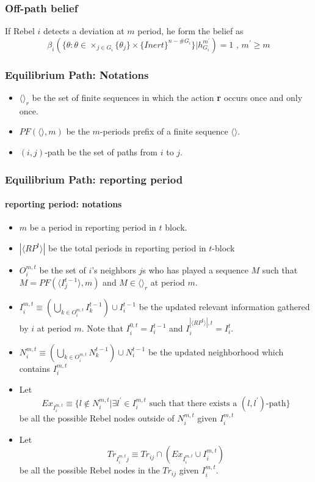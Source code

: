 \documentclass[12pt,letterpaper]{article}
\newtheorem*{main result}{Main Result}
\theoremstyle{definition}
\theoremstyle{remark}
\theoremstyle{claim}
\begin{document}
\subsubsection{Off-path belief}

If Rebel $i$ detects a deviation at $m$ period, he form the belief as
\begin{equation}
\beta_{i}(\{\theta:\theta\in \times_{j\in G_i}\{\theta_j\}\times\{Inert\}^{n-\#G_i}\}|h^{m^{'}}_{G_i})=1 \text{ , } m^{'}\geq m
\end{equation}



\subsubsection{Equilibrium Path: Notations}


\begin{itemize}

\item $\langle \rangle_r$ be the set of finite sequences in which the action \textbf{r} occurs once and only once.
\item $PF(\langle \rangle,m)$ be the $m$-periods prefix of a finite sequence $\langle \rangle$.
\item $(i,j)$-path be the set of paths from $i$ to $j$.

\end{itemize}

\subsubsection{Equilibrium Path: reporting period}

\paragraph{reporting period: notations}
\begin{itemize}
\item $m$ be a period in reporting period in $t$ block.
\item $|\langle RP^t \rangle|$ be the total periods in reporting period in $t$-block
\item $O^{m,t}_i$ be the set of $i$'s neighbors $j$s who has played a sequence $M$ such that $M=PF(\langle I^{t-1}_j \rangle,m)$ and $M \in \langle \rangle_r$ at period $m$. 
\item $I^{m,t}_i\equiv (\bigcup_{k\in O^{m,t}_i} I^{t-1}_k)\cup I^{t-1}_i$ be the updated relevant information gathered by $i$ at period $m$. Note that $I^{0,t}_i=I^{t-1}_i$ and $I^{|\langle RP^t \rangle|,t }_i=I^{t}_i$.
\item $N^{m,t}_i\equiv (\bigcup_{k\in O^{m,t}_i} N^{t-1}_k)\cup N^{t-1}_i$
be the updated neighborhood which contains $I^{m,t}_i$

\item Let 
\[Ex_{I^{m,t}_i}\equiv \{l\notin N^{m,t}_i|\exists l^{'}\in I^{m,t}_i\text{ such that there exists a $(l,l^{'})$-path}\}\]
be all the possible Rebel nodes outside of $N^{m,t}_i$ given $I^{m,t}_i$
\item Let
\[Tr_{I^{m,t}_ij}\equiv Tr_{ij}\cap (Ex_{I^{m,t}_i}\cup I^{m,t}_i)\]
be all the possible Rebel nodes in the $Tr_{ij}$ given $I^{m,t}_i$. 
\end{itemize}
\end{document}
